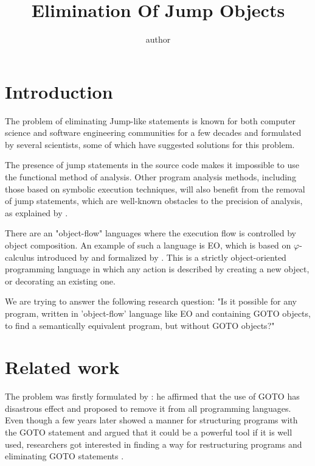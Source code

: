 \documentclass[sigplan,review,11pt,nonacm,natbib=false]{acmart}
\title{Elimination Of Jump Objects}
\author{author}
\theoremstyle{theorems}
\begin{document}
\maketitle

\section{Introduction}
The problem of eliminating Jump-like statements is known for both computer science and software engineering communities for a few decades and formulated by several scientists, some of which have suggested solutions for this problem.

The presence of jump statements in the source code makes it impossible to use the functional method of analysis.
Other program analysis methods, including those based on symbolic execution techniques, will also benefit from the removal of jump statements, which are well-known obstacles to the precision of analysis, as explained by \citet{baldoni2018survey}.

There are an "object-flow" languages where the execution flow is controlled by object composition.
An example of such a language is EO, which is based on $\varphi$-calculus introduced by \citet{bugayenko2021eolang} and formalized by \citet{kudasov2021}.
This is a strictly object-oriented programming language in which any action is described by creating a new object, or decorating an existing one.

We are trying to answer the following research question: "Is it possible for any program, written in 'object-flow' language like EO and containing GOTO objects, to find a semantically equivalent program, but without GOTO objects?"

\section{Related work}
The problem was firstly formulated by \citet{dijkstra1968letters}: he affirmed that the use of GOTO has disastrous effect and proposed to remove it from all programming languages.
Even though a few years later \citet{knuth1974structured} showed a manner for structuring programs with the GOTO statement and argued that it could be a powerful tool if it is well used, researchers got interested in finding a way for restructuring programs and eliminating GOTO statements \citep{arsac1977construction}.
\end{document}
